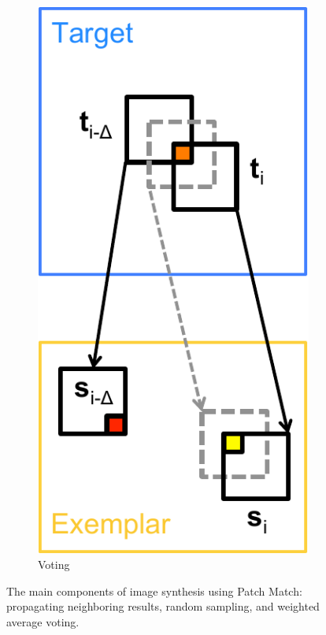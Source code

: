 \begin{figure}[ht]
	\begin{subfigure}[t]{0.155\textwidth}
		\includegraphics[width=\textwidth]{figures/voting_text}
		\caption{Voting}
	\end{subfigure}
   \caption{The main components of image synthesis using Patch Match: propagating neighboring results, random sampling, and weighted average voting.}
\label{fig:texsynth_patchmatch}
\end{figure}

